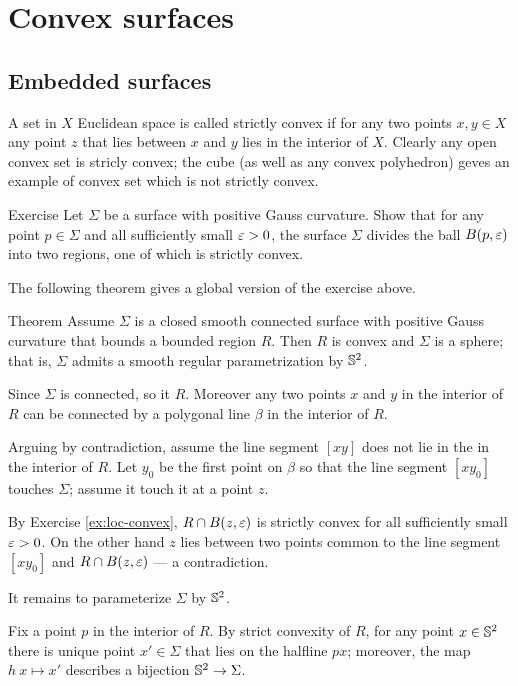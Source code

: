 \chapter{Convex surfaces}


\section{Embedded surfaces}
A set in $X$ Euclidean space is called strictly convex if for any two points $x,y\in X$ any point $z$ that lies between $x$ and $y$ lies in the interior of $X$.
Clearly any open convex set is stricly convex;
the cube (as well as any convex polyhedron) geves an example of convex set which is not strictly convex.

\begin{thm}{Exercise}\label{ex:loc-convex}
Let $\Sigma$ be a surface with positive Gauss curvature.
Show that for any point $p\in \Sigma$ and all sufficiently small $\varepsilon>0$,
the surface $\Sigma$ divides the ball $B(p,\varepsilon)$ into two regions, one of which is strictly convex.
\end{thm}

The following theorem gives a global version of the exercise above.

\begin{thm}{Theorem}\label{thm:convex-embedded}
Assume $\Sigma$ is a closed smooth connected surface with positive Gauss curvature that bounds a bounded region $R$.
Then $R$ is convex and $\Sigma$ is a sphere; that is, $\Sigma$ admits a smooth regular parametrization by $\mathbb{S}^2$.

\end{thm}

 Since $\Sigma$ is connected, so it $R$.
Moreover any two points $x$ and $y$ in the interior of $R$ can be connected by a polygonal line $\beta$ in the interior of $R$.

Arguing by contradiction, assume the line segment $[xy]$ does not lie in the   in the interior of $R$.
Let $y_0$ be the first point on $\beta$ so that the line segment $[xy_0]$ touches $\Sigma$; assume it touch it at a point $z$.

By Exercise \ref{ex:loc-convex}, $R\cap B(z,\varepsilon)$ is strictly convex for all sufficiently small $\varepsilon>0$.
On the other hand $z$ lies between two points common to the line segment $[xy_0]$ and $R\cap B(z,\varepsilon)$ --- a contradiction.

It remains to parameterize $\Sigma$ by $\mathbb{S}^2$.

Fix a point $p$ in the interior of $R$.
By strict convexity of $R$, for any point $x\in \mathbb{S}^2$ there is unique point $x'\in \Sigma$ that lies on the halfline $px$;
moreover, the map $h\:x\mapsto x'$ describes a bijection $\mathbb{S}^2\to \Sigma$.

